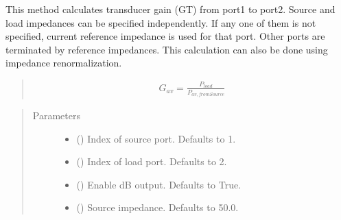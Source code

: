 \documentclass[letterpaper,10pt,english]{sphinxmanual}
\begin{document}
\begin{fulllineitems}
\begin{fulllineitems}
\label{\detokenize{touchstone:touchstone.spfile.gt}}
This method calculates transducer gain (GT) from port1 to port2. Source and load impedances can be specified independently. If any one of them is not specified, current reference impedance is used for that port. Other ports are terminated by reference impedances. This calculation can also be done using impedance renormalization.
\begin{quote}
\begin{equation*}
\begin{split}G_{av}=\frac{P_{load}}{P_{av,fromSource}}\end{split}
\end{equation*}\end{quote}
\begin{quote}\begin{description}
\item[{Parameters}] \leavevmode\begin{itemize}
\item {} 
 (\sphinxstyleliteralemphasis{\sphinxupquote{, }}) \textendash{} Index of source port. Defaults to 1.

\item {} 
 (\sphinxstyleliteralemphasis{\sphinxupquote{, }}) \textendash{} Index of load port. Defaults to 2.

\item {} 
 (\sphinxstyleliteralemphasis{\sphinxupquote{, }}) \textendash{} Enable dB output. Defaults to True.

\item {} 
 (\sphinxstyleliteralemphasis{\sphinxupquote{, }}) \textendash{} Source impedance. Defaults to 50.0.


\end{itemize}
\end{description}
\end{quote}
\end{fulllineitems}
\end{fulllineitems}
\end{document}
